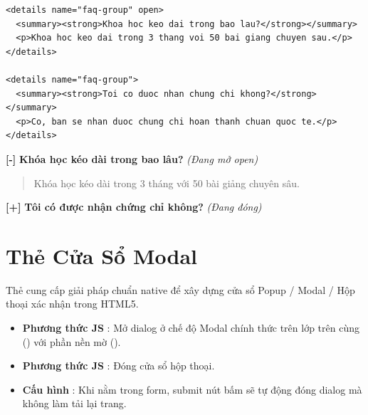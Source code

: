 \begin{codeWindow}
\begin{lstlisting}[language=HTML5]
<details name="faq-group" open>
  <summary><strong>Khoa hoc keo dai trong bao lau?</strong></summary>
  <p>Khoa hoc keo dai trong 3 thang voi 50 bai giang chuyen sau.</p>
</details>

<details name="faq-group">
  <summary><strong>Toi co duoc nhan chung chi khong?</strong></summary>
  <p>Co, ban se nhan duoc chung chi hoan thanh chuan quoc te.</p>
</details>
\end{lstlisting}
\end{codeWindow}

\begin{browserWindow}
\sffamily\small
\textbf{[-]} \textbf{Khóa học kéo dài trong bao lâu?} \quad \textcolor{codeComment}{\small\textit{(Đang mở open)}} \\
\begin{quote}\small
Khóa học kéo dài trong 3 tháng với 50 bài giảng chuyên sâu.
\end{quote}
\textbf{[+]} \textbf{Tôi có được nhận chứng chỉ không?} \quad \textcolor{codeComment}{\small\textit{(Đang đóng)}}
\end{browserWindow}

\section{Thẻ Cửa Sổ Modal }
\label{sec:dialog_modal}

\begin{conceptBox}
Thẻ  cung cấp giải pháp chuẩn native để xây dựng cửa sổ Popup / Modal / Hộp thoại xác nhận trong HTML5.
\begin{itemize}[leftmargin=1.5em, itemsep=2pt, parsep=0pt]
    \item \textbf{Phương thức JS }: Mở dialog ở chế độ Modal chính thức trên lớp trên cùng () với phần nền mờ ().
    \item \textbf{Phương thức JS }: Đóng cửa sổ hộp thoại.
    \item \textbf{Cấu hình }: Khi nằm trong form, submit nút bấm sẽ tự động đóng dialog mà không làm tải lại trang.
\end{itemize}
\end{conceptBox}

